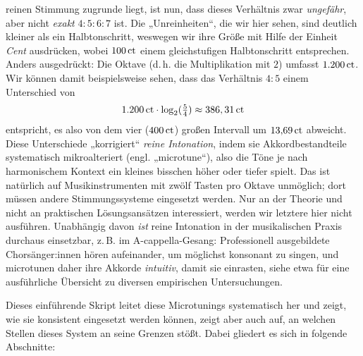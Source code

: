 reinen Stimmung zugrunde liegt, ist nun, dass dieses Verhältnis zwar
\emph{ungefähr}, aber nicht \emph{exakt} $4:5:6:7$ ist. Die „Unreinheiten“, die
wir hier sehen, sind deutlich kleiner als ein Halbtonschritt, weswegen wir ihre
Größe mit Hilfe der Einheit \emph{Cent} ausdrücken, wobei $100\,\mathrm{ct}$ einem
gleichstufigen Halbtonschritt entsprechen. Anders ausgedrückt: Die Oktave (d.\,h. die
Multiplikation mit $2$) umfasst $1{.}200\,\mathrm{ct}$. Wir können damit
beispielsweise sehen, dass das Verhältnis $4:5$ einem Unterschied von
\[1{.}200\,\mathrm{ct}\cdot \log_2(\tfrac54) \approx 386,31\,\mathrm{ct}\]%
entspricht, es also von dem vier  ($400\,\mathrm{ct}$) großen Intervall um
$13{,}69\,\mathrm{ct}$ abweicht. Diese Unterschiede „korrigiert“ \emph{reine
  Intonation}, indem sie Akkordbestandteile systematisch mikroalteriert
(engl. „microtune“), also die Töne je nach harmonischem Kontext ein kleines
bisschen höher oder tiefer spielt. Das ist natürlich auf Musikinstrumenten mit
zwölf Tasten pro Oktave unmöglich; dort müssen andere Stimmungssysteme
eingesetzt werden. Nur an der Theorie und nicht an praktischen Lösungsansätzen
interessiert, werden wir letztere hier nicht ausführen. Unabhängig davon
\emph{ist} reine Intonation in der musikalischen Praxis durchaus einsetzbar,
z.\,B. im A-cappella-Gesang: Professionell ausgebildete Chorsänger:innen hören
aufeinander, um möglichst konsonant zu singen, und microtunen daher ihre Akkorde
\emph{intuitiv}, damit sie einrasten, siehe etwa \cite[§\,2.4]{Maria} für eine
ausführliche Übersicht zu diversen empirischen Untersuchungen.

Dieses einführende Skript leitet diese Microtunings systematisch her und zeigt,
wie sie konsistent eingesetzt werden können, zeigt aber auch auf, an welchen
Stellen dieses System an seine Grenzen stößt. Dabei gliedert es sich in folgende
Abschnitte:

